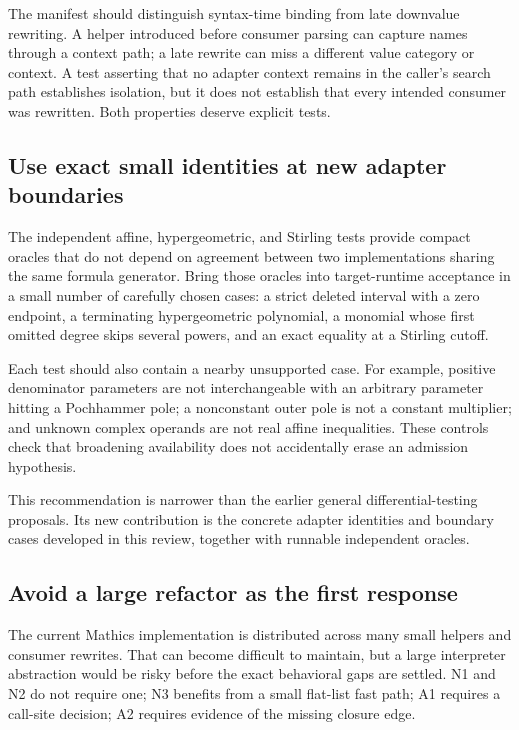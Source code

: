 \documentclass[11pt,letterpaper]{article}
\begin{document}
The manifest should distinguish syntax-time binding from late downvalue rewriting. A helper introduced before consumer parsing can capture names through a context path; a late rewrite can miss a different value category or context. A test asserting that no adapter context remains in the caller's search path establishes isolation, but it does not establish that every intended consumer was rewritten. Both properties deserve explicit tests.

\subsection{Use exact small identities at new adapter boundaries}

The independent affine, hypergeometric, and Stirling tests provide compact oracles that do not depend on agreement between two implementations sharing the same formula generator. Bring those oracles into target-runtime acceptance in a small number of carefully chosen cases: a strict deleted interval with a zero endpoint, a terminating hypergeometric polynomial, a monomial whose first omitted degree skips several powers, and an exact equality at a Stirling cutoff.

Each test should also contain a nearby unsupported case. For example, positive denominator parameters are not interchangeable with an arbitrary parameter hitting a Pochhammer pole; a nonconstant outer pole is not a constant multiplier; and unknown complex operands are not real affine inequalities. These controls check that broadening availability does not accidentally erase an admission hypothesis.

This recommendation is narrower than the earlier general differential-testing proposals. Its new contribution is the concrete adapter identities and boundary cases developed in this review, together with runnable independent oracles.

\subsection{Avoid a large refactor as the first response}

The current Mathics implementation is distributed across many small helpers and consumer rewrites. That can become difficult to maintain, but a large interpreter abstraction would be risky before the exact behavioral gaps are settled. N1 and N2 do not require one; N3 benefits from a small flat-list fast path; A1 requires a call-site decision; A2 requires evidence of the missing closure edge.
\end{document}
